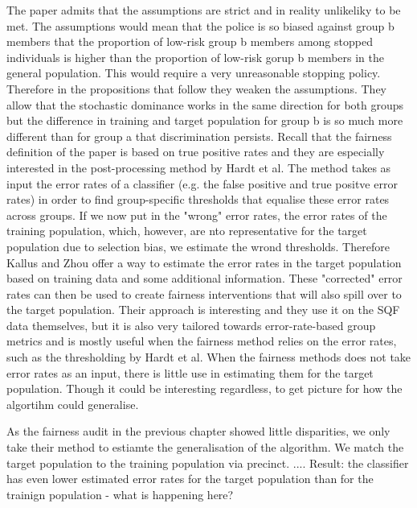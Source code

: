 The paper admits that the assumptions are strict and in reality unlikeliky to be met. The assumptions would mean that the police is so biased against group b members that the proportion of low-risk group b members among stopped individuals is higher than the proportion of low-risk gorup b members in the general population. This would require a very unreasonable stopping policy.
Therefore in the propositions that follow they weaken the assumptions. They allow that the stochastic dominance works in the same direction for both groups but the difference in training and target population for group b is so much more different than for group a that discrimination persists.
Recall that the fairness definition of the paper is based on true positive rates and they are especially interested in the post-processing method by Hardt et al. The method takes as input the error rates of a classifier (e.g. the false positive and true positve error rates) in order to find group-specific thresholds that equalise these error rates across groups.
If we now put in the "wrong" error rates, the error rates of the training population, which, however, are nto representative for the target population due to selection bias, we estimate the wrond thresholds. Therefore Kallus and Zhou offer a way to estimate the error rates in the target population based on training data and some additional information.
These "corrected" error rates can then be used to create fairness interventions that will also spill over to the target population. Their approach is interesting and they use it on the SQF data themselves, but it is also very tailored towards error-rate-based group metrics and is mostly useful when the fairness method relies on the error rates, such as the thresholding by Hardt et al. When the fairness methods does not take error rates as an input, there is little use in estimating them for the target population.
Though it could be interesting regardless, to get picture for how the algortihm could generalise.

As the fairness audit in the previous chapter showed little disparities, we only take their method to estiamte the generalisation of the algorithm.
We match the target population to the training population via precinct.
....
Result: the classifier has even lower estimated error rates for the target population than for the trainign population - what is happening here?


